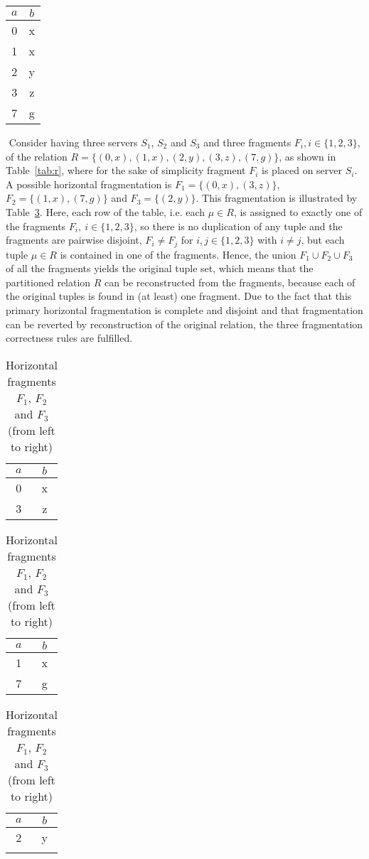\begin{exmp}
$ $\newline
    \begin{center}
    \begin{tabular}{c|c} 
         $a$ & $b$\\
         \hline
         0 & x \\
         1 & x \\
         2 & y \\
         3 & z \\
         7 & g \\
    \end{tabular}
     \label{tab:r}
    \end{center}
$ $\newline
Consider having three servers $S_1$, $S_2$ and $S_3$ and three fragments $F_i,i\in\{1,2,3\}$, of the relation $R=\{(0,x), (1,x), (2,y), (3,z), (7,g)\}$, 
as shown in Table~\ref{tab:r}, where for the sake of simplicity fragment $F_i$ is placed on server $S_i$. 
A possible horizontal fragmentation is $F_1=\{(0,x), (3,z)\}$, $F_2=\{(1,x), (7,g)\}$ and $F_3=\{(2,y)\}$. This fragmentation is illustrated 
by Table~\ref{tab:r_frag}. Here, each row of the table, i.e. each $\mu \in R$, is assigned to exactly one of the fragments $F_i,~i\in\{1,2,3\}$, 
so there is no duplication of any tuple and the fragments are pairwise disjoint, $F_i \neq F_j$ for $i,j \in \{1,2,3\}$ with $i \neq j$, 
but each tuple $\mu \in R$ is contained in one of the fragments. Hence, the union $F_1 \cup F_2 \cup F_3$ of all the fragments yields the original tuple set,
which means that the partitioned relation $R$ can be reconstructed from the fragments, because each of the original tuples is found in (at least) one
fragment. Due to the fact that this primary horizontal fragmentation is complete and disjoint and that fragmentation can be reverted by reconstruction of the
original relation, the three fragmentation correctness rules \cite[p.~103]{Ozsu1991} are fulfilled.
\begin{table}[h]
    \hspace*{\fill}
    \begin{tabular}{c|c}
        $a$ & $b$\\
        \hline
        0 & x \\
        3 & z
    \end{tabular}
    \hfill
    \begin{tabular}{c|c}
        $a$ & $b$\\
        \hline
        1 & x \\
        7 & g
    \end{tabular}
    \hfill
    \begin{tabular}{c|c}
        $a$ & $b$\\
        \hline
        2 & y \\
         & 
    \end{tabular}
    \hspace*{\fill}
    \caption{Horizontal fragments $F_1$, $F_2$ and $F_3$ (from left to right)}
    \label{tab:r_frag}
\end{table}
\end{exmp}
 